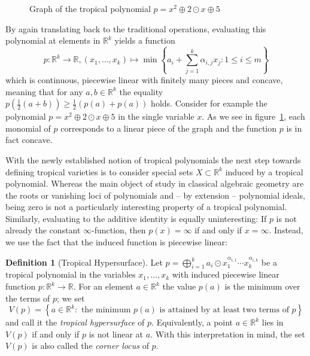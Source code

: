 \documentclass[
  paper=a4,
  titlepage,
  bibliography=totoc,
  listof=totoc,
  pagesize=pdftex
]{scrartcl}
\numberwithin{figure}{section}
\numberwithin{equation}{section}
\numberwithin{table}{section}
\newcommand*\setR{\mathds{R}}
\theoremstyle{definition}
\newtheorem{definition}{Definition}
\numberwithin{definition}{section}
\begin{document}
\begin{figure}[tbh]
  \centering
  \caption{Graph of the tropical polynomial $p=x^2\oplus 2\odot x \oplus 5$}
  \label{fig:tropPolyPlot}
\end{figure}

By again translating back to the traditional operations, evaluating this polynomial at
elements in $\setR^k$ yields a function
\[
  p : \setR^k \to \setR, (x_1, \dots, x_k) \mapsto
  \min\left\{
    a_i + \sum_{j=1}^k \alpha_{i,j}x_j : 1 \leq i \leq m
  \right\}
\]
which is continuous, piecewise linear with finitely many pieces and concave, meaning that
for any $a,b \in \setR^k$ the equality $p(\frac12(a+b)) \geq \frac12(p(a)+p(a))$ holds.
Consider for example the polynomial $p = x^2 \oplus 2\odot x \oplus 5$ in the single
variable $x$. As we see in figure~\ref{fig:tropPolyPlot}, each monomial of $p$ corresponds
to a linear piece of the graph and the function $p$ is in fact concave.

With the newly established notion of tropical polynomials the next step towards defining
tropical varieties is to consider special sets $X \subset \setR^k$ induced by a tropical
polynomial. Whereas the main object of study in classical algebraic geometry are the roots
or vanishing loci of polynomials and -- by extension -- polynomial ideals, being zero is
not a particularly interesting property of a tropical polynomial. Similarly, evaluating to
the additive identity is equally uninteresting: If $p$ is not already the constant
$\infty$-function, then $p(x)=\infty$ if and only if $x=\infty$. Instead, we use the fact
that the induced function is piecewise linear:

\begin{definition}[Tropical Hypersurface]
  Let $p = \bigoplus_{i=1}^k a_i \odot x_1^{\alpha_{i,1}}\cdots x_k^{\alpha_{i,k}}$ be a
  tropical polynomial in the variables $x_1, \dots, x_k$ with induced piecewise linear
  function $p:\setR^k \to \setR$. For an element $a\in \setR^k$ the value $p(a)$ is the
  minimum over the terms of $p$; we set
  \[
    V(p) = \left\{
      a \in \setR^k :
      \text{ the minimum $p(a)$ is attained by at least two terms of $p$}
    \right\}
  \]
  and call it the \emph{tropical hypersurface} of $p$. Equivalently, a point $a\in
  \setR^k$ lies in $V(p)$ if and only if $p$ is not linear at $a$. With this
  interpretation in mind, the set $V(p)$ is also called the \emph{corner locus} of $p$.
  \label{def:tropHypersurface}
\end{definition}
\end{document}
